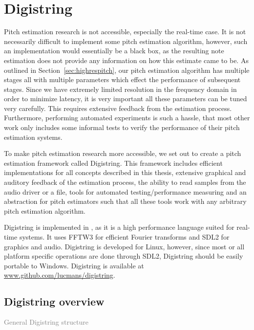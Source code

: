 \documentclass[10pt,twocolumn]{article}
\begin{document}
\section{Digistring}
%
Pitch estimation research is not accessible, especially the real-time case. It is not necessarily difficult to implement some pitch estimation algorithm, however, such an implementation would essentially be a black box, as the resulting note estimation does not provide any information on how this estimate came to be. As outlined in Section~\ref{sec:highrespitch}, our pitch estimation algorithm has multiple stages all with multiple parameters which effect the performance of subsequent stages. Since we have extremely limited resolution in the frequency domain in order to minimize latency, it is very important all these parameters can be tuned very carefully. This requires extensive feedback from the estimation process. Furthermore, performing automated experiments is such a hassle, that most other work only includes some informal tests to verify the performance of their pitch estimation systems.

To make pitch estimation research more accessible, we set out to create a pitch estimation framework called Digistring. This framework includes efficient implementations for all concepts described in this thesis, extensive graphical and auditory feedback of the estimation process, the ability to read samples from the audio driver or a file, tools for automated testing/performance measuring and an abstraction for pitch estimators such that all these tools work with any arbitrary pitch estimation algorithm.

Digistring is implemented in \cpluspluslogo, as it is a high performance language suited for real-time systems. It uses FFTW3 for efficient Fourier transforms and SDL2 for graphics and audio. Digistring is developed for Linux, however, since most or all platform specific operations are done through SDL2, Digistring should be easily portable to Windows. Digistring is available at \url{www.github.com/lucmans/digistring}.

\subsection{Digistring overview}
\textcolor{gray}{General Digistring structure}
\end{document}
